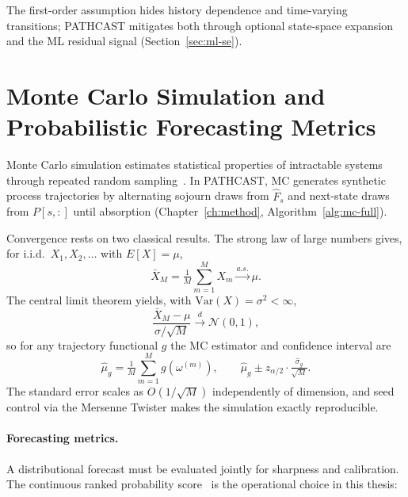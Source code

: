 The first-order assumption hides history dependence and time-varying
transitions; PATHCAST mitigates both through optional state-space
expansion and the ML residual signal (Section~\ref{sec:ml-se}).


\section{Monte Carlo Simulation and Probabilistic Forecasting Metrics}
\label{sec:monte-carlo}

Monte Carlo simulation estimates statistical properties of intractable
systems through repeated random sampling~\cite{metropolis1949monte,
robert2004monte}. In PATHCAST, MC generates synthetic process trajectories
by alternating sojourn draws from $\hat{F}_s$ and next-state draws from
$P[s,:]$ until absorption (Chapter~\ref{ch:method},
Algorithm~\ref{alg:mc-full}).

Convergence rests on two classical results. The strong law of large
numbers gives, for i.i.d.\ $X_1, X_2, \ldots$ with $E[X]=\mu$,
\begin{equation}
\label{eq:lln}
\bar{X}_M = \tfrac{1}{M}\sum_{m=1}^{M} X_m \xrightarrow{a.s.} \mu.
\end{equation}
The central limit theorem yields, with $\text{Var}(X)=\sigma^2 < \infty$,
\begin{equation}
\label{eq:clt}
\frac{\bar{X}_M - \mu}{\sigma/\sqrt{M}} \xrightarrow{d} \mathcal{N}(0,1),
\end{equation}
so for any trajectory functional $g$ the MC estimator and confidence
interval are
\begin{equation}
\label{eq:mc-estimator}
\hat{\mu}_g = \tfrac{1}{M}\sum_{m=1}^{M} g(\omega^{(m)}),
\qquad
\hat{\mu}_g \pm z_{\alpha/2} \cdot \tfrac{\hat{\sigma}_g}{\sqrt{M}}.
\label{eq:mc-ci}
\end{equation}
The standard error scales as $O(1/\sqrt{M})$ independently of
dimension, and seed control via the Mersenne Twister makes the simulation
exactly reproducible.

\paragraph{Forecasting metrics.} A distributional forecast must be
evaluated jointly for sharpness and calibration. The continuous ranked
probability score~\cite{gneiting2007strictly} is the operational
choice in this thesis:

